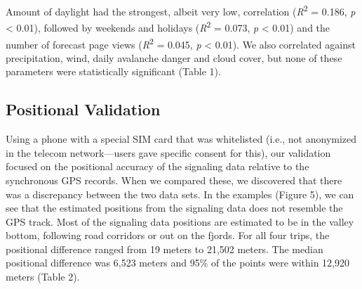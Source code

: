 \documentclass[authordate,empirical]{jote-new-article}
\begin{document}
Amount of daylight had the strongest, albeit very low, correlation (\emph{R}\textsuperscript{2} = 0.186, \emph{p} < 0.01), followed by weekends and holidays (\emph{R}\textsuperscript{2} = 0.073, \emph{p} < 0.01) and the number of forecast page views (\emph{R}\textsuperscript{2} = 0.045, \emph{p} < 0.01). We also correlated against precipitation, wind, daily avalanche danger and cloud cover, but none of these parameters were statistically significant (Table 1).













\subsection{Positional Validation}



Using a phone with a special SIM card that was whitelisted (i.e., not anonymized in the telecom network—users gave specific consent for this), our validation focused on the positional accuracy of the signaling data relative to the synchronous GPS records. When we compared these, we discovered that there was a discrepancy between the two data sets. In the examples (Figure 5), we can see that the estimated positions from the signaling data does not resemble the GPS track. Most of the signaling data positions are estimated to be in the valley bottom, following road corridors or out on the fjords. For all four trips, the positional difference ranged from 19 meters to 21,502 meters. The median positional difference was 6,523 meters and 95\% of the points were within 12,920 meters (Table 2).
\end{document}
